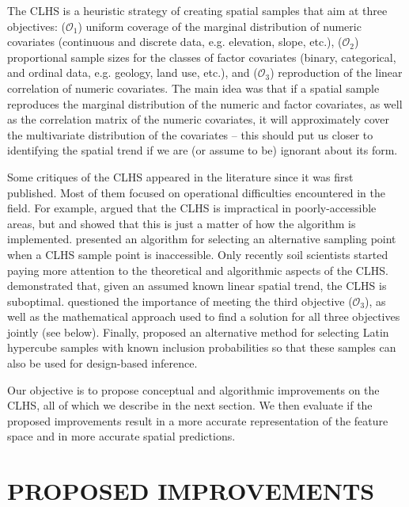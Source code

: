 The CLHS is a heuristic strategy of creating spatial samples that aim at three objectives: ($\mathcal{O}_1$) 
uniform coverage of the marginal distribution of numeric covariates (continuous and discrete data, e.g. 
elevation, slope, etc.), ($\mathcal{O}_2$) proportional sample sizes for the classes of factor covariates 
(binary, categorical, and ordinal data, e.g. geology, land use, etc.), and ($\mathcal{O}_3$) reproduction of 
the linear correlation of numeric covariates. The main idea was that if a spatial sample reproduces the 
marginal distribution of the numeric and factor covariates, as well as the correlation matrix of the numeric 
covariates, it will approximately cover the multivariate distribution of the covariates -- this should put us 
closer to identifying the  spatial trend if we are (or assume to be) ignorant about its form.

Some critiques of the CLHS appeared in the literature since it was first published. Most of them focused on 
operational difficulties encountered in the field. For example, \citet{CambuleEtAl2013} argued that the 
CLHS is impractical in poorly-accessible areas, but \citet{RoudierEtAl2012} and \citet{MulderEtAl2013} showed 
that this is just a matter of how the algorithm is implemented. \citet{CliffordEtAl2014} presented an 
algorithm for selecting an alternative sampling point when a CLHS sample point is inaccessible. Only recently 
soil scientists started paying more attention to the theoretical and algorithmic aspects of the CLHS. 
\citet{MinasnyEtAl2010a} demonstrated that, given an assumed known linear spatial trend, the CLHS is 
suboptimal. \citet{CliffordEtAl2014} questioned the importance of meeting the third objective 
($\mathcal{O}_3$), as well as the mathematical approach used to find a solution for all three objectives 
jointly (see below). Finally, \citet{Brus2015} proposed an alternative method for selecting Latin hypercube 
samples with known inclusion probabilities so that these samples can also be used for design-based inference.

Our objective is to propose conceptual and algorithmic improvements on the CLHS, all of which we describe in 
the next section. We then evaluate if the proposed improvements result in a more accurate representation of 
the feature space and in more accurate spatial predictions.

\section{PROPOSED IMPROVEMENTS}

